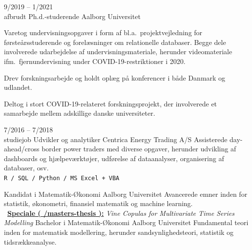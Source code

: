 \documentclass[9pt]{template/developercv}
\newcommand{\link}[2]{\faLink~\href{#1}{\textbf{#2}}}
\begin{document}
\begin{entrylist}
  \entry
  {9/2019 -- 1/2021\\{\footnotesize afbrudt}}
  {Ph.d.-studerende}
  {Aalborg Universitet}
  {
    Varetog undervisningsopgaver i form af bl.a.\ projektvejledning for førsteårsstuderende og forelæsninger om relationelle databaser.
    Begge dele involverede udarbejdelse af undervisningsmateriale, herunder videomateriale ifm.\ fjernundervisning under COVID-19-restriktioner i 2020.

    Drev forskningsarbejde og holdt oplæg på konferencer i både Danmark og udlandet.

    Deltog i stort COVID-19-relateret forskningsprojekt, der involverede et samarbejde mellem adskillige danske universiteter.
  }

  \entry
  {7/2016 -- 7/2018\\{\footnotesize studiejob}}
  {Udvikler og analytiker}
  {Centrica Energy Trading A/S}
  {
    Assisterede day-ahead/cross border power traders med diverse opgaver, herunder udvikling af dashboards og hjælpeværktøjer, udførelse af dataanalyser, organisering af databaser, osv.
    \\
    \texttt{R / SQL / Python / MS Excel + VBA}
  }
\end{entrylist}

\begin{entrylist}
   {Kandidat i Matematik-Økonomi} {Aalborg Universitet} {
    Avancerede emner inden for statistik, økonometri, finansiel matematik og machine learning.\\
    \link{https://github.com/janusvm/masters-thesis}{Speciale ( \faGithub/masters-thesis ):}
    \emph{Vine Copulas for Multivariate Time Series Modelling}%
  }
   {Bachelor i Matematik-Økonomi} {Aalborg Universitet} {
    Fundamental teori inden for matematisk modellering, herunder sandsynlighedsteori, statistik og tidsrækkeanalyse.
  }
\end{entrylist}
\end{document}
